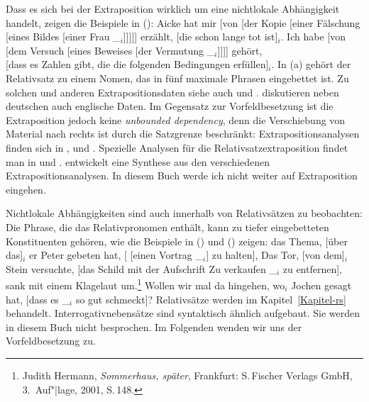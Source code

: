 Dass es sich bei der Extraposition wirklich um eine nichtlokale Abhängigkeit handelt,
zeigen die Beispiele in ():
\eal
\ex Aicke hat mir [von [der Kopie [einer Fälschung [eines Bildes [einer Frau \_$_i$]]]]] erzählt,
    [die schon lange tot ist]$_i$.
\ex Ich habe [von [dem Versuch [eines Beweises [der Vermutung \_$_i$]]]] gehört,\\
       {}[dass es Zahlen gibt, die die folgenden Bedingungen erfüllen]$_i$.
\zl
In (a) gehört der Relativsatz zu einem Nomen, das in fünf maximale Phrasen eingebettet
ist. Zu solchen und anderen Extrapositionsdaten siehe auch 
und \textcites{Mueller2004d,Mueller2007c}[Abschnitt~13.1.5.1]{MuellerGT-Eng5}. \citet[Abschnitt~3.3]{SS2013b-u} diskutieren
neben deutschen auch englische Daten. Im Gegensatz zur
Vorfeldbesetzung ist die Extraposition jedoch keine \emph{unbounded dependency}, denn die
Verschiebung von Material nach rechts ist durch die Satzgrenze beschränkt:
\eal
{}
\zl
Extrapositionsanalysen finden sich in ,  und
. Spezielle Analysen für die Relativsatzextraposition findet man in
 und . \citet{Crysmann2013a} entwickelt eine Synthese aus den
verschiedenen Extrapositionsanalysen. In diesem Buch werde ich nicht weiter auf Extraposition
eingehen.

Nichtlokale Abhängigkeiten sind auch innerhalb von Relativsätzen zu beobachten: Die Phrase, die
das Relativpronomen enthält, kann zu tiefer eingebetteten Konstituenten gehören, wie die
Beispiele in () und () zeigen:
\eal
\label{bsp-nla-rs}
\ex{}
das Thema, [über das]$_i$ er Peter gebeten hat, [ [einen Vortrag \_$_i$] zu halten],
\ex{} 
Das Tor, [von dem]$_i$ Stein versuchte, [das Schild mit der Aufschrift \frqq Zu verkaufen\flqq{} \_$_i$ zu entfernen], sank mit einem
Klagelaut um.\footnote{
  Judith Hermann, \emph{Sommerhaus, später}, Frankfurt: S.\,Fischer Verlags GmbH, 3.\, Auf"|lage, 2001, S.\,148.%
}
\zl
\ea
Wollen wir mal da hingehen, wo$_i$ Jochen gesagt hat, [dass es \_$_i$ so gut schmeckt]?
\z{}
Relativsätze werden im Kapitel~\ref{Kapitel-rs} behandelt. Interrogativnebensätze sind syntaktisch ähnlich aufgebaut.
Sie werden in diesem Buch nicht besprochen. Im Folgenden wenden wir uns der Vorfeldbesetzung zu.


